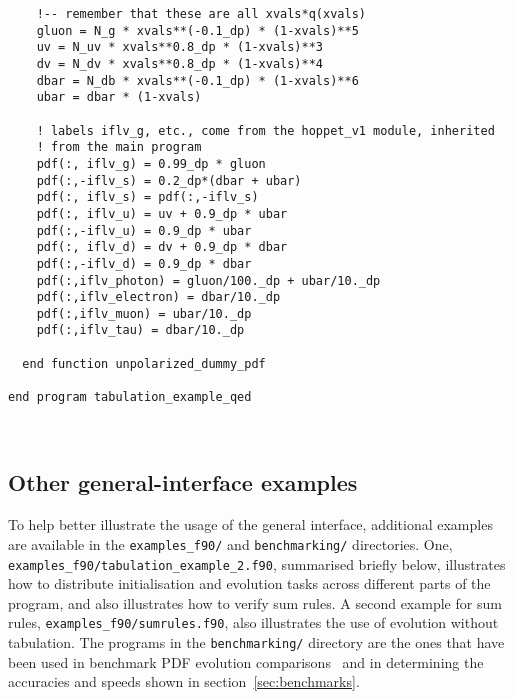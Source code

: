 \documentclass[12pt]{article}
\newcommand{\ttt}[1]{\texttt{#1}}
\begin{document}
\begin{lstlisting}
    !-- remember that these are all xvals*q(xvals)
    gluon = N_g * xvals**(-0.1_dp) * (1-xvals)**5
    uv = N_uv * xvals**0.8_dp * (1-xvals)**3
    dv = N_dv * xvals**0.8_dp * (1-xvals)**4
    dbar = N_db * xvals**(-0.1_dp) * (1-xvals)**6
    ubar = dbar * (1-xvals)

    ! labels iflv_g, etc., come from the hoppet_v1 module, inherited
    ! from the main program
    pdf(:, iflv_g) = 0.99_dp * gluon
    pdf(:,-iflv_s) = 0.2_dp*(dbar + ubar)
    pdf(:, iflv_s) = pdf(:,-iflv_s)
    pdf(:, iflv_u) = uv + 0.9_dp * ubar
    pdf(:,-iflv_u) = 0.9_dp * ubar
    pdf(:, iflv_d) = dv + 0.9_dp * dbar
    pdf(:,-iflv_d) = 0.9_dp * dbar
    pdf(:,iflv_photon) = gluon/100._dp + ubar/10._dp 
    pdf(:,iflv_electron) = dbar/10._dp
    pdf(:,iflv_muon) = ubar/10._dp
    pdf(:,iflv_tau) = dbar/10._dp         

  end function unpolarized_dummy_pdf

end program tabulation_example_qed



\end{lstlisting}

\subsection{Other general-interface examples}

To help better illustrate the usage of the general interface,
additional examples are available in the \ttt{examples\_f90/} and
\ttt{benchmarking/} directories. One,
\ttt{examples\_f90/tabulation\_example\_2.f90}, summarised briefly
below, illustrates how to distribute initialisation and evolution
tasks across different parts of the program, and also illustrates how
to verify sum rules. A second example for sum rules,
\ttt{examples\_f90/sumrules.f90}, also illustrates the use of
evolution without tabulation.
%
The programs in the \ttt{benchmarking/} directory are the ones that
have been used in benchmark PDF evolution
comparisons~\cite{Giele:2002hx,Dittmar:2005ed} and in determining the accuracies and
speeds shown in section~\ref{sec:benchmarks}.
\end{document}
